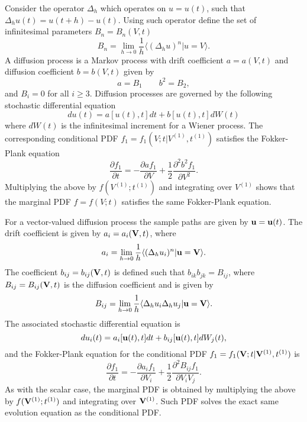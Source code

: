 \documentclass[oneside,a4paper,11pt]{report}
\begin{document}
Consider the operator $\Delta_h$ which operates on $u = u(t)$, such that $\Delta_h u(t) = u(t+h) - u(t)$. Using such operator define the set of infinitesimal parameters $B_n = B_n(V,t)$
\begin{equation}
B_n = \lim_{h\to0} \frac{1}{h} \langle ( \Delta_h u )^n | u = V \rangle.
\end{equation}
A diffusion process is a Markov process with drift coefficient $a = a(V,t)$ and diffusion coefficient $b = b(V,t)$ given by
\begin{equation}
a = B_1 \qquad
b^2 = B_2,
\end{equation}
and $B_i = 0$ for all $i \ge 3$. Diffusion processes  are governed by the following stochastic differential equation
\begin{equation}
du(t) = a[u(t),t] dt + b[u(t),t] dW(t)
\end{equation}
where $dW(t)$ is the infinitesimal increment for a Wiener process. The corresponding conditional PDF $f_1 = f_1(V;t | V^{(1)},t^{(1)})$ satisfies the Fokker-Plank equation
\begin{equation}
\frac{\partial f_1}{\partial t} = - \frac{\partial a f_1}{\partial V} + \frac{1}{2} \frac{\partial ^2 b^2 f_1}{\partial V^2}.
\end{equation}
Multiplying the above by $f(V^{(1)};t^{(1)})$ and integrating over $V^{(1)}$ shows that the marginal PDF $f = f(V;t)$ satisfies the same Fokker-Plank equation.

For a vector-valued diffusion process the sample paths are given by $\mathbf{u} =  \mathbf{u}(t)$. The drift coefficient is given by $a_i = a_i(\mathbf{V},t)$, where
\begin{equation}
a_i = \lim_{h\to0} \frac{1}{h} \langle ( \Delta_h u_i )^n | \mathbf{u} = \mathbf{V} \rangle.
\end{equation}
The coefficient $b_{ij} = b_{ij}(\mathbf{V}, t)$ is defined such that $b_{ik}b_{jk} = B_{ij}$, where $B_{ij} = B_{ij}(\mathbf{V},t)$ is the diffusion coefficient and is given by
\begin{equation}
B_{ij} = \lim_{h\to0} \frac{1}{h} \langle \Delta_h u_i \Delta_h u_j  | \mathbf{u} = \mathbf{V} \rangle.
\end{equation}
The associated stochastic differential equation is
\begin{equation}
du_i(t) = a_i[\mathbf{u}(t),t] dt + b_{ij} [\mathbf{u}(t),t] dW_j(t),
\end{equation}
and the Fokker-Plank equation for the conditional PDF $f_1 = f_1(\mathbf{V}; t| \mathbf{V}^{(1)}, t^{(1)})$ is
\begin{equation}
\label{fokkerplank_3d}
\frac{\partial f_1}{\partial t} = - \frac{\partial a_i f_1}{\partial V_i} + \frac{1}{2} \frac{\partial^2 B_{ij} f_1}{\partial V_i V_j}.
\end{equation}
As with the scalar case, the marginal PDF is obtained by multiplying the above by $f(\mathbf{V}^{(1)};t^{(1)})$ and integrating over $\mathbf{V}^{(1)}$. Such PDF solves the exact same evolution equation as the conditional PDF.
\end{document}
